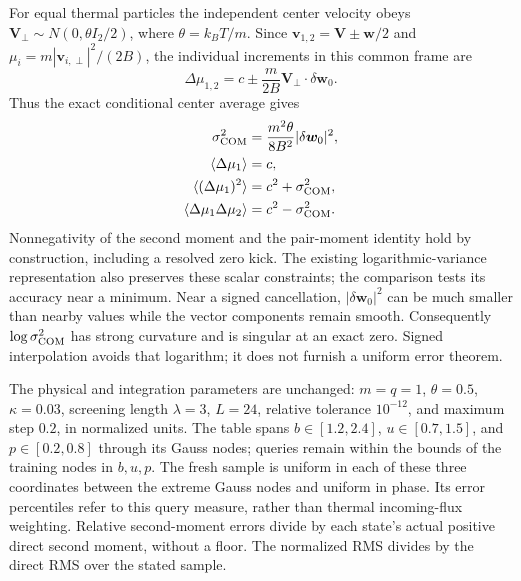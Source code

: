 \documentclass[11pt,letterpaper]{article}
\begin{document}
For equal thermal particles the independent center velocity obeys
$\boldsymbol V_\perp\sim N(0,\theta I_2/2)$, where
$\theta=k_BT/m$.  Since
$\boldsymbol v_{1,2}=\boldsymbol V\pm\boldsymbol w/2$ and
$\mu_i=m|\boldsymbol v_{i,\perp}|^2/(2B)$, the individual increments in
this common frame are
\begin{equation}
 \Delta\mu_{1,2}
   =c\pm\frac{m}{2B}\boldsymbol V_\perp\cdot\delta\boldsymbol w_0.
\end{equation}
Thus the exact conditional center average gives
\begin{align}
 \sigma_{\rm COM}^2
   &=\frac{m^2\theta}{8B^2}|\delta\boldsymbol w_0|^2,\\
 \langle\Delta\mu_1\rangle&=c,\\
 \langle(\Delta\mu_1)^2\rangle&=c^2+\sigma_{\rm COM}^2,\\
 \langle\Delta\mu_1\Delta\mu_2\rangle&=c^2-\sigma_{\rm COM}^2.
 \label{eq:signed-kick-com}
\end{align}
Nonnegativity of the second moment and the pair-moment identity hold by
construction, including a resolved zero kick.  The existing logarithmic-variance representation also preserves
these scalar constraints; the comparison tests its accuracy near a minimum.
Near a signed cancellation, $|\delta\boldsymbol w_0|^2$ can be much smaller
than nearby values while the vector components remain smooth.  Consequently
$\log\sigma_{\rm COM}^2$ has strong curvature and is singular at an exact
zero.  Signed interpolation avoids that logarithm; it does not furnish a
uniform error theorem.

The physical and integration parameters are unchanged:
$m=q=1$, $\theta=0.5$, $\kappa=0.03$, screening length $\lambda=3$,
$L=24$, relative tolerance $10^{-12}$, and maximum step $0.2$, in normalized
units.  The table spans
$b\in[1.2,2.4]$, $u\in[0.7,1.5]$, and $p\in[0.2,0.8]$ through its
Gauss nodes; queries remain within the bounds of the training nodes in
$b,u,p$. The fresh sample is uniform in each of these three coordinates
between the extreme Gauss nodes and uniform in phase. Its error percentiles
refer to this query measure, rather than thermal incoming-flux weighting. Relative
second-moment errors divide by each state's actual positive direct second
moment, without a floor.  The normalized RMS divides by the direct RMS over
the stated sample.
\end{document}
